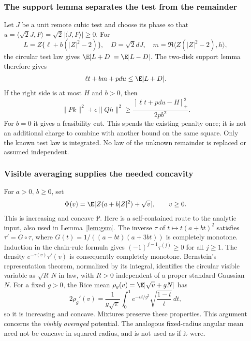 \subsubsection{The support lemma separates the test from the remainder}
Let $J$ be a unit remote cubic test and choose its phase so that
$u=\langle\sqrt2J,F\rangle=\sqrt2|\langle J,F\rangle|\ge0$.
For
\[
 L=Z\{\ell+b(|Z|^2-2)\},\quad D=\sqrt2dJ,\quad
 m=\Re\langle Z(|Z|^2-2),h\rangle,
\]
the circular test law gives $\E|L+D|=\E|L-D|$.
The two-disk support lemma therefore gives
\[
 \ell t+bm+pdu\le\E|L+D|.
\]
If the right side is at most $H$ and $b>0$, then
\begin{equation}\label{eq:slice-support-penalty}
 \|Pk\|^2+\epsilon\|Qh\|^2
 \ge\frac{[\ell t+pdu-H]_+^2}{2pb^2}.
\end{equation}
For $b=0$ it gives a feasibility cut. This spends the existing penalty
once; it is not an additional charge to combine with another bound on
the same square. Only the known test law is integrated. No law of the
unknown remainder is replaced or assumed independent.

\subsubsection{Visible averaging supplies the needed concavity}
For $a>0$, $b\ge0$, set
\[
 \Phi(v)=\E|Z(a+b|Z|^2)+\sqrt v|,\qquad v\ge0.
\]
This is increasing and concave \st{P}. Here is a self-contained route
to the analytic input, also used in Lemma~\ref{lem:gsm}.
The inverse $\tau$ of $t\mapsto t(a+bt)^2$ satisfies
$\tau'=G\circ\tau$, where
$G(t)=1/((a+bt)(a+3bt))$ is completely monotone.
Induction in the chain-rule formula gives
$(-1)^{j-1}\tau^{(j)}\ge0$ for all $j\ge1$.
The density $e^{-\tau(v)}\tau'(v)$ is consequently completely
monotone. Bernstein's representation theorem, normalized by its
integral, identifies the circular visible variable as $\sqrt R\,N$
in law, with $R>0$ independent of a proper standard Gaussian $N$.
For a fixed $g>0$, the Rice mean $\rho_g(v)=\E|\sqrt v+gN|$ has
\[
 2\rho_g'(v)=\frac1{g\sqrt\pi}
   \int_0^1e^{-vt/g^2}\sqrt{\frac{1-t}{t}}\,dt,
\]
so it is increasing and concave. Mixtures preserve these properties.
This argument concerns the \emph{visibly averaged} potential.
The analogous fixed-radius angular mean need not be concave in squared
radius, and is not used as if it were.

